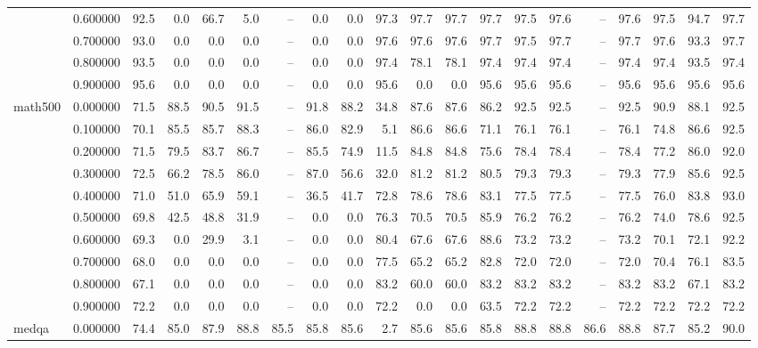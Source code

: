 \begin{tabular}{llrrrrrrrrrrrrrrrrrr}
 & 0.600000 & 92.5 & 0.0 & 66.7 & 5.0 & -- & 0.0 & 0.0 & 97.3 & 97.7 & 97.7 & 97.7 & 97.5 & 97.6 & -- & 97.6 & 97.5 & 94.7 & 97.7 \\
 & 0.700000 & 93.0 & 0.0 & 0.0 & 0.0 & -- & 0.0 & 0.0 & 97.6 & 97.6 & 97.6 & 97.7 & 97.5 & 97.7 & -- & 97.7 & 97.6 & 93.3 & 97.7 \\
 & 0.800000 & 93.5 & 0.0 & 0.0 & 0.0 & -- & 0.0 & 0.0 & 97.4 & 78.1 & 78.1 & 97.4 & 97.4 & 97.4 & -- & 97.4 & 97.4 & 93.5 & 97.4 \\
 & 0.900000 & 95.6 & 0.0 & 0.0 & 0.0 & -- & 0.0 & 0.0 & 95.6 & 0.0 & 0.0 & 95.6 & 95.6 & 95.6 & -- & 95.6 & 95.6 & 95.6 & 95.6 \\
\cline{1-20}
\multirow[t]{10}{*}{math500} & 0.000000 & 71.5 & 88.5 & 90.5 & 91.5 & -- & 91.8 & 88.2 & 34.8 & 87.6 & 87.6 & 86.2 & 92.5 & 92.5 & -- & 92.5 & 90.9 & 88.1 & 92.5 \\
 & 0.100000 & 70.1 & 85.5 & 85.7 & 88.3 & -- & 86.0 & 82.9 & 5.1 & 86.6 & 86.6 & 71.1 & 76.1 & 76.1 & -- & 76.1 & 74.8 & 86.6 & 92.5 \\
 & 0.200000 & 71.5 & 79.5 & 83.7 & 86.7 & -- & 85.5 & 74.9 & 11.5 & 84.8 & 84.8 & 75.6 & 78.4 & 78.4 & -- & 78.4 & 77.2 & 86.0 & 92.0 \\
 & 0.300000 & 72.5 & 66.2 & 78.5 & 86.0 & -- & 87.0 & 56.6 & 32.0 & 81.2 & 81.2 & 80.5 & 79.3 & 79.3 & -- & 79.3 & 77.9 & 85.6 & 92.5 \\
 & 0.400000 & 71.0 & 51.0 & 65.9 & 59.1 & -- & 36.5 & 41.7 & 72.8 & 78.6 & 78.6 & 83.1 & 77.5 & 77.5 & -- & 77.5 & 76.0 & 83.8 & 93.0 \\
 & 0.500000 & 69.8 & 42.5 & 48.8 & 31.9 & -- & 0.0 & 0.0 & 76.3 & 70.5 & 70.5 & 85.9 & 76.2 & 76.2 & -- & 76.2 & 74.0 & 78.6 & 92.5 \\
 & 0.600000 & 69.3 & 0.0 & 29.9 & 3.1 & -- & 0.0 & 0.0 & 80.4 & 67.6 & 67.6 & 88.6 & 73.2 & 73.2 & -- & 73.2 & 70.1 & 72.1 & 92.2 \\
 & 0.700000 & 68.0 & 0.0 & 0.0 & 0.0 & -- & 0.0 & 0.0 & 77.5 & 65.2 & 65.2 & 82.8 & 72.0 & 72.0 & -- & 72.0 & 70.4 & 76.1 & 83.5 \\
 & 0.800000 & 67.1 & 0.0 & 0.0 & 0.0 & -- & 0.0 & 0.0 & 83.2 & 60.0 & 60.0 & 83.2 & 83.2 & 83.2 & -- & 83.2 & 83.2 & 67.1 & 83.2 \\
 & 0.900000 & 72.2 & 0.0 & 0.0 & 0.0 & -- & 0.0 & 0.0 & 72.2 & 0.0 & 0.0 & 63.5 & 72.2 & 72.2 & -- & 72.2 & 72.2 & 72.2 & 72.2 \\
\cline{1-20}
\multirow[t]{10}{*}{medqa} & 0.000000 & 74.4 & 85.0 & 87.9 & 88.8 & 85.5 & 85.8 & 85.6 & 2.7 & 85.6 & 85.6 & 85.8 & 88.8 & 88.8 & 86.6 & 88.8 & 87.7 & 85.2 & 90.0 \\

\end{tabular}
